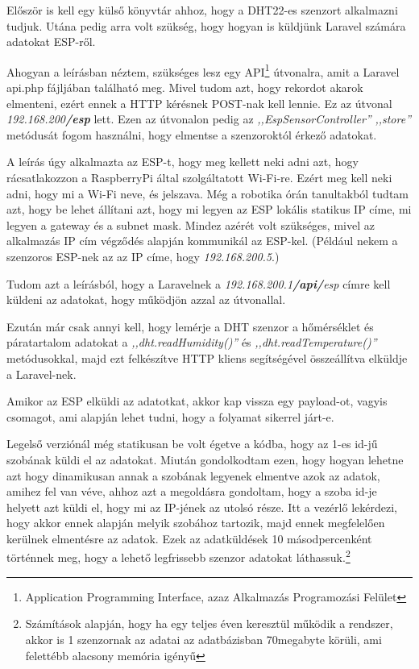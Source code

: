 \documentclass[
]{thesis-ekf}
\theoremstyle{definition}
\theoremstyle{remark}
\begin{document}
	Először is kell egy külső könyvtár ahhoz, hogy a DHT22-es szenzort alkalmazni tudjuk.\cite{adafruit-dht-library} Utána pedig arra volt szükség, hogy hogyan is küldjünk Laravel számára adatokat ESP-ről.\cite{arduino-to-laravel}
	
	Ahogyan a leírásban néztem, szükséges lesz egy API\footnote{Application Programming Interface, azaz Alkalmazás Programozási Felület} útvonalra, amit a Laravel api.php fájljában található meg. Mivel tudom azt, hogy rekordot akarok elmenteni, ezért ennek a HTTP kérésnek POST-nak kell lennie. Ez az útvonal \emph{192.168.200\textbf{/esp}} lett. Ezen az útvonalon pedig az \emph{,,EspSensorController''} \emph{,,store''} metódusát fogom használni, hogy elmentse a szenzoroktól érkező adatokat. 
	
	A leírás úgy alkalmazta az ESP-t, hogy meg kellett neki adni azt, hogy rácsatlakozzon a RaspberryPi által szolgáltatott Wi-Fi-re. Ezért meg kell neki adni, hogy mi a Wi-Fi neve, és jelszava. Még a robotika órán tanultakból tudtam azt, hogy be lehet állítani azt, hogy mi legyen az ESP lokális statikus IP címe, mi legyen a gateway és a subnet mask. Mindez azérét volt szükséges, mivel az alkalmazás IP cím végződés alapján kommunikál az ESP-kel. (Például nekem a szenzoros ESP-nek az az IP címe, hogy \emph{192.168.200.5}.)
	
	Tudom azt a leírásból, hogy a Laravelnek a \emph{192.168.200.1\textbf{/api/}esp} címre kell küldeni az adatokat, hogy működjön azzal az útvonallal. 
	
	Ezután már csak annyi kell, hogy lemérje a DHT szenzor a hőmérséklet és páratartalom adatokat a \emph{,,dht.readHumidity()''} és \emph{,,dht.readTemperature()''} metódusokkal, majd ezt felkészítve HTTP kliens segítségével összeállítva elküldje a Laravel-nek.
	
	Amikor az ESP elküldi az adatotkat, akkor kap vissza egy payload-ot, vagyis csomagot, ami alapján lehet tudni, hogy a folyamat sikerrel járt-e.
	
	Legelső verziónál még statikusan be volt égetve a kódba, hogy az 1-es id-jű szobának küldi el az adatokat. Miután gondolkodtam ezen, hogy hogyan lehetne azt hogy dinamikusan annak a szobának legyenek elmentve azok az adatok, amihez fel van véve, ahhoz azt a megoldásra gondoltam, hogy a szoba id-je helyett azt küldi el, hogy mi az IP-jének az utolsó része. Itt a vezérlő lekérdezi, hogy akkor ennek alapján melyik szobához tartozik, majd ennek megfelelően kerülnek elmentésre az adatok. Ezek az adatküldések 10 másodpercenként történnek meg, hogy a lehető legfrissebb szenzor adatokat láthassuk.\footnote{Számítások alapján, hogy ha egy teljes éven keresztül működik a rendszer, akkor is 1 szenzornak az adatai az adatbázisban 70megabyte körüli, ami felettébb alacsony memória igényű}
	
\end{document}
